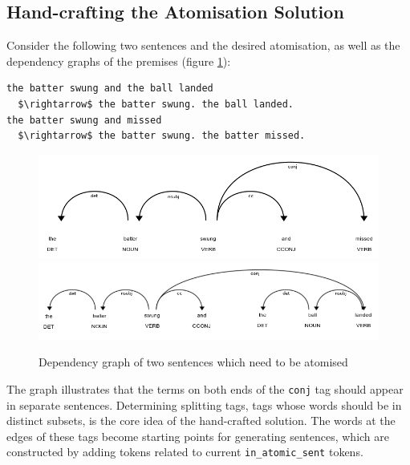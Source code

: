 \subsection{Hand-crafting the Atomisation Solution}
\label{hand-crafting-the-atomisation-solution}

Consider the following two sentences and the desired atomisation, as well as the dependency graphs of the premises (figure \ref{atomisation-examples}):
\begin{lstlisting}
the batter swung and the ball landed 
  $\rightarrow$ the batter swung. the ball landed.
the batter swung and missed 
  $\rightarrow$ the batter swung. the batter missed.
\end{lstlisting}

\begin{figure}[h]
\caption{Dependency graph of two sentences which need to be atomised}
\centering
\includegraphics[width=\textwidth]{solving-nlp-tasks-logically/dependency-graph-one-subj.png}
\includegraphics[width=\textwidth]{solving-nlp-tasks-logically/dependency-graph-two-subj.png}
\label{atomisation-examples}
\end{figure}

The graph illustrates that the terms on both ends of the \verb_conj_ tag should appear in separate sentences. 
Determining splitting tags, tags whose words should be in distinct subsets, is the core idea of the hand-crafted solution.
The words at the edges of these tags become starting points for generating sentences, which are constructed by adding tokens related to current \verb+in_atomic_sent+ tokens.

